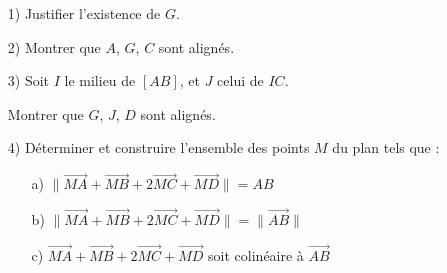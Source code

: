 \documentclass[12pt]{article}
\begin{document}
\begin{enumerate}
    \item[1)] Justifier l'existence de \( G \).
    
    \item[2)] Montrer que \( A \), \( G \), \( C \) sont alignés.
    
    \item[3)] Soit \( I \) le milieu de \( [AB] \), et \( J \) celui de \( IC \). 
    
    Montrer que \( G \), \( J \), \( D \) sont alignés.
    
    \item[4)] Déterminer et construire l'ensemble des points \( M \) du plan tels que :
    \begin{enumerate}
        \item[a)] \( \| \overrightarrow{MA} + \overrightarrow{MB} + 2\overrightarrow{MC} + \overrightarrow{MD} \| = AB \)
        \item[b)] \( \| \overrightarrow{MA} + \overrightarrow{MB} + 2\overrightarrow{MC} + \overrightarrow{MD} \| = \| \overrightarrow{AB} \| \)
        \item[c)] \( \overrightarrow{MA} + \overrightarrow{MB} + 2\overrightarrow{MC} + \overrightarrow{MD}  \) soit colinéaire à \( \overrightarrow{AB} \)
    \end{enumerate}
\end{enumerate}
\end{document}
